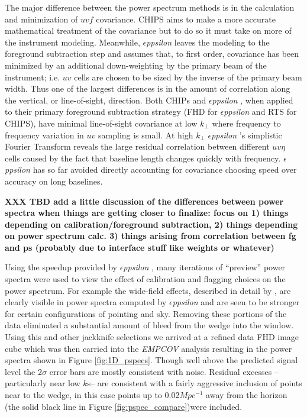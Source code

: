 \documentclass[preprint]{aastex}
\def\eppsilon{{\it $\epsilon$ppsilon }}
\def\empirical cov{\emph{EMPCOV }}
\begin{document}
The major difference between the power spectrum methods is in the calculation and minimization of $uvf$ covariance.   CHIPS aims to make a more accurate mathematical treatment of the covariance but to do so it must take on more of the instrument modeling. Meanwhile, \eppsilon leaves the modeling to the foreground subtraction step and assumes that, to first order, covariance has been minimized by an  additional down-weighting by the primary beam of the instrument;  i.e. $uv$ cells are chosen to be sized by the inverse of the primary beam width.  Thus one of the largest differences is in the amount of correlation along the vertical, or line-of-sight, direction.  Both CHIPs and \eppsilon, when applied to their  primary foreground subtraction strategy (FHD for \eppsilon and RTS for CHIPS), have minimal line-of-sight covariance at low $k_\perp$ where frequency to frequency variation in $uv$ sampling is small. At high $k_\perp$ \eppsilon's simplistic Fourier Transform reveals the large residual correlation between different $uv\eta$ cells caused by the fact that baseline length changes quickly with frequency.  \eppsilon has so far avoided directly accounting for covariance choosing speed over accuracy on long baselines.

{\bf XXX TBD add a little discussion of the differences between power spectra when things are getting closer to finalize: focus on 1) things depending on calibration/foreground subtraction, 2) things depending on power spectrum calc.  3) things arising from correlation between fg and ps (probably due to interface stuff like weights or whatever)}


Using the speedup provided by \eppsilon, many iterations of ``preview'' power spectra were used to view the effect of calibration and flagging choices on the power spectrum. For example the wide-field effects, described in detail by \cite{2015arXiv150207596T}, are clearly visible in power spectra computed by \eppsilon and are seen to be stronger for certain configurations of pointing and sky. Removing these portions of the data eliminated a substantial amount of bleed from the wedge into the window.  Using this and other jackknife selections we arrived at a refined data FHD image cube which was then carried into the \empirical cov analysis resulting in the power spectra shown in Figure \ref{fig:1D_pspecs}.   Though well above the predicted signal level the 2$\sigma$ error bars are mostly consistent with noise.   Residual excesses --particularly near low $k$s--  are consistent with a fairly aggressive inclusion of points near to the wedge, in this case points up to 0.02$Mpc^{-1}$ away from the horizon (the solid black line in Figure \ref{fig:pspec_compare})were included.
\end{document}
